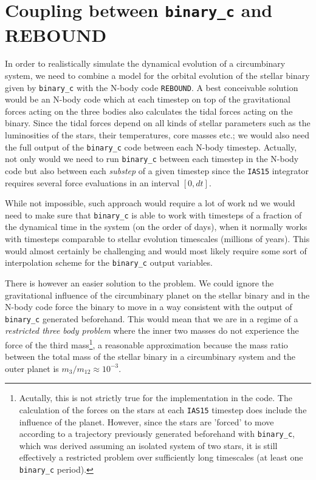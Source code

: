 \documentclass[twoside,openright,titlepage,numbers=noenddot,headinclude,%
                footinclude=true,cleardoublepage=empty,abstractoff, 
                BCOR=5mm,paper=a4,fontsize=11pt,%
                american,%
                ]{scrreprt}%
\begin{document}
\section{Coupling between \texttt{binary\_c} and REBOUND}
\label{sec:coupling_binary_c_rebound}
In order to realistically simulate the dynamical evolution of a circumbinary
system, we need to combine a model for the orbital evolution of the stellar
binary given by \texttt{binary\_c} with the N-body code \texttt{REBOUND}. A best
conceivable solution would be an N-body code which at each timestep on top of
the gravitational forces acting on the three bodies also calculates the 
tidal forces acting on the binary. Since 
the tidal forces depend on all kinds of stellar parameters such as the
luminosities of the stars, their temperatures, core masses etc.; 
we would also need the full output of the \texttt{binary\_c} code between each 
N-body timestep. Actually, not only would we need to run \texttt{binary\_c} 
between each timestep in the N-body code but also between each \emph{substep}  
of a given timestep since the \texttt{IAS15} integrator requires several force
evaluations in an interval $[0,dt]$.

While not impossible, such approach would require a lot of work nd we
would need to make sure that \texttt{binary\_c} is able to work with timesteps
of a fraction of the dynamical time in the system (on the order of days), when
it normally works with timesteps comparable to stellar evolution timescales 
(millions of years). This would almost certainly be challenging and would most
likely
require some sort of interpolation scheme for the \texttt{binary\_c} output
variables.

There is  however an easier solution to the problem. We could ignore the gravitational
influence of the circumbinary planet on the stellar binary and in the N-body
code force the binary to move in a way consistent with the output of 
\texttt{binary\_c} generated beforehand. This would mean that we are in a regime
of a \emph{restricted three body problem} where the inner two masses do not 
experience the force of the third mass\footnote{Acutally, this is not strictly
true for the implementation in the code. The calculation of the forces on the 
stars at each \texttt{IAS15} timestep does include the influence of the planet.
However, since the stars are 'forced' to move according to a trajectory 
previously generated
beforehand with \texttt{binary\_c}, which was derived assuming an isolated system of 
two stars, it is still effectively a restricted problem over sufficiently long
timescales (at least one \texttt{binary\_c} period).}, a reasonable 
approximation because
the mass ratio between the total mass of the stellar binary in a circumbinary
system and the outer planet is $m_3/m_{12}\approx 10^{-3}$.
\end{document}
